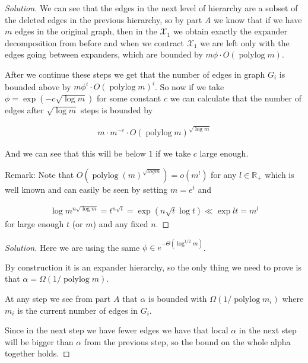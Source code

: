 \documentclass[a4paper,11pt]{article}
\DeclareMathOperator{\polylog}{polylog}
\newcommand{\R}{\mathbb{R}}
\newenvironment{solution}
  {\begin{proof}[Solution]}
  {\end{proof}}
\begin{document}
\begin{solution}
We can see that the edges in the next level of hierarchy are a subset of the deleted edges in the previous hierarchy, so by part $A$ we know that if we have $m$ edges in the original graph, then in the $\mathcal{X}_1$ we obtain exactly the expander decomposition from before and when we contract $\mathcal{X}_1$ we are left only with the edges going between expanders, which are bounded by $m \phi \cdot O(\polylog m)$.

After we continue these steps we get that the number of edges in graph $G_i$ is bounded above by $m \phi^i \cdot O(\polylog m)^i$. So now if we take $\phi = \exp (-c \sqrt{\log m})$ for some constant $c$ we can calculate that the number of edges after $\sqrt{\log m}$ steps is bounded by

\begin{align*}
    m \cdot m^{-c} \cdot O(\polylog m) ^{\sqrt{\log m}}
\end{align*}

And we can see that this will be below $1$ if we take $c$ large enough.


Remark: Note that $O(\polylog (m)^{\sqrt{log m}})  =  o(m^l)$ for any $l \in \R _+$ which is well known and can easily be seen by setting $m = e^t$ and 

\begin{align*}
    \log m ^{n\sqrt   { \log m}} = t ^{n \sqrt t} = \exp (n \sqrt t\log t) \ll \exp lt = m^l
\end{align*}
 for large enough $t$ (or $m$) and any fixed $n$.
\end{solution}

\begin{solution}
Here we are using the same $\phi \in e^{-\Theta(\log^{1/2} m)}$. 

By construction it is an expander hierarchy, so the only thing we need to prove is that $\alpha = \Omega (1 / \polylog m )$. 

At any step we see from part $A$ that $\alpha$ is bounded with $\Omega (1 / \polylog m_i)$ where $m_i$ is the current number of edges in $G_i$.
 
Since in the next step we have fewer edges we have that local $\alpha$ in the next step will be bigger than $\alpha$ from the previous step, so the bound on the whole alpha together holds.
\end{solution}
\end{document}
